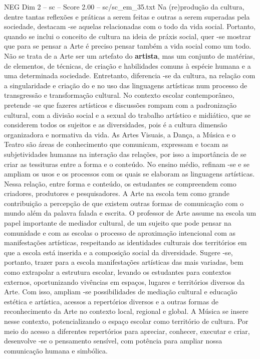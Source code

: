 \begin{textsample}{NEG Dim 2 – sc – Score 2.00 – sc/sc\_em\_35.txt}
Na (re)produção da cultura, dentre tantas reflexões e práticas a serem feitas e outras a serem superadas pela sociedade, destacam -se aquelas relacionadas com o todo da vida social.
Portanto, quando se inclui o conceito de cultura na ideia de práxis social, quer -se mostrar que para se pensar a Arte é preciso pensar também a vida social como um todo.
Não se trata de a Arte ser um artefato do \textbf{artista}, mas um conjunto de matérias, de elementos, de técnicas, de criação e habilidades comuns à espécie humana e a uma determinada sociedade.
Entretanto, diferencia -se da cultura, na relação com a singularidade e criação do e no uso das linguagens artísticas num processo de transgressão e transformação cultural.
No contexto escolar contemporâneo, pretende -se que fazeres artísticos e discussões rompam com a padronização cultural, com a divisão social e a sexual do trabalho artístico e midiático, que se considerem todos os sujeitos e as diversidades, pois é a cultura dimensão organizadora e normativa da vida.
As Artes Visuais, a Dança, a Música e o Teatro são áreas de conhecimento que comunicam, expressam e tocam as subjetividades humanas na interação das relações, por isso a importância de se criar as tessituras entre a forma e o conteúdo.
No ensino médio, refinam -se e se ampliam os usos e os processos com os quais se elaboram as linguagens artísticas.
Nessa relação, entre forma e conteúdo, os estudantes se compreendem como criadores, produtores e pesquisadores.
A Arte na escola tem como grande contribuição a percepção de que existem outras formas de comunicação com o mundo além da palavra falada e escrita.
O professor de Arte assume na escola um papel importante de mediador cultural, de um sujeito que pode pensar na comunidade e com as escolas o processo de aproximação intencional com as manifestações artísticas, respeitando as identidades culturais dos territórios em que a escola está inserida e a composição social da diversidade.
Sugere -se, portanto, trazer para a escola manifestações artísticas das mais variadas, bem como extrapolar a estrutura escolar, levando os estudantes para contextos externos, oportunizando vivências em espaços, lugares e territórios diversos da Arte.
Com isso, ampliam -se possibilidades de mediação cultural e educação estética e artística, acessos a repertórios diversos e a outras formas de reconhecimento da Arte no contexto local, regional e global.
A Música se insere nesse contexto, potencializando o espaço escolar como território de cultura.
Por meio do acesso a diferentes repertórios para apreciar, conhecer, executar e criar, desenvolve -se o pensamento sensível, com potência para ampliar nossa comunicação humana e simbólica.

\end{textsample}
